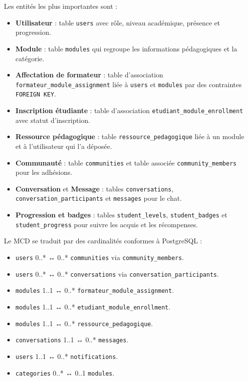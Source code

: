 \documentclass[12pt,a4paper,oneside]{report}
\begin{document}
Les entités les plus importantes sont :
\begin{itemize}
  \item \textbf{Utilisateur} : table \texttt{users} avec rôle, niveau académique, présence et progression.
  \item \textbf{Module} : table \texttt{modules} qui regroupe les informations pédagogiques et la catégorie.
  \item \textbf{Affectation de formateur} : table d'association \texttt{formateur\_module\_assignment} liée à \texttt{users} et \texttt{modules} par des contraintes \texttt{FOREIGN KEY}.
  \item \textbf{Inscription étudiante} : table d'association \texttt{etudiant\_module\_enrollment} avec statut d'inscription.
  \item \textbf{Ressource pédagogique} : table \texttt{ressource\_pedagogique} liée à un module et à l'utilisateur qui l'a déposée.
  \item \textbf{Communauté} : table \texttt{communities} et table associée \texttt{community\_members} pour les adhésions.
  \item \textbf{Conversation} et \textbf{Message} : tables \texttt{conversations}, \texttt{conversation\_participants} et \texttt{messages} pour le chat.
  \item \textbf{Progression et badges} : tables \texttt{student\_levels}, \texttt{student\_badges} et \texttt{student\_progress} pour suivre les acquis et les récompenses.
\end{itemize}

Le MCD se traduit par des cardinalités conformes à PostgreSQL :
\begin{itemize}
  \item \texttt{users} 0..* ↔ 0..* \texttt{communities} via \texttt{community\_members}.
  \item \texttt{users} 0..* ↔ 0..* \texttt{conversations} via \texttt{conversation\_participants}.
  \item \texttt{modules} 1..1 ↔ 0..* \texttt{formateur\_module\_assignment}.
  \item \texttt{modules} 1..1 ↔ 0..* \texttt{etudiant\_module\_enrollment}.
  \item \texttt{modules} 1..1 ↔ 0..* \texttt{ressource\_pedagogique}.
  \item \texttt{conversations} 1..1 ↔ 0..* \texttt{messages}.
  \item \texttt{users} 1..1 ↔ 0..* \texttt{notifications}.
  \item \texttt{categories} 0..* ↔ 0..1 \texttt{modules}.
\end{itemize}
\end{document}
